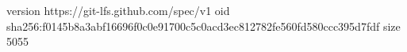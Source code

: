 version https://git-lfs.github.com/spec/v1
oid sha256:f0145b8a3abf16696f0c0e91700c5c0acd3ec812782fe560fd580ccc395d7fdf
size 5055
